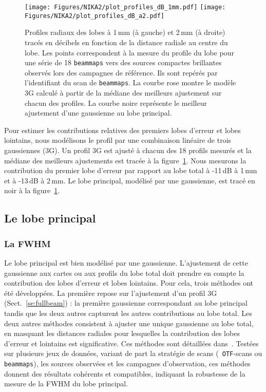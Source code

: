 \begin{figure}[!thbp]
  \centering
   \texttt{[image: Figures/NIKA2/plot\_profiles\_dB\_1mm.pdf]}
   \texttt{[image: Figures/NIKA2/plot\_profiles\_dB\_a2.pdf]}
   \caption[Stability of the beam profile]{Profiles radiaux des lobes
     à 1\,mm (à gauche) et 2\,mm (à droite) tracés en décibels en
     fonction de la distance radiale au centre du lobe. Les points
     correspondent à la mesure du profile du lobe pour une série de 18
     {\tt beammaps} vers des sources compactes brillantes observés
     lors des campagnes de référence. Ils sont repérés par
     l'identifiant du scan de {\tt beammaps}. La courbe rose montre le
     modèle 3G calculé à partir de la médiane des meilleurs ajustement
     sur chacun des profiles. La courbe noire représente le meilleur
     ajustement d'une gaussienne au lobe principal.}
  \label{fig:beam_prof}
\end{figure}

Pour estimer les contributions relatives des premiers lobes
d'erreur et lobes lointains, nous modélisons le profil par une
combinaison linéaire de trois gaussiennes (3G). Un profil 3G est
ajusté à chacun des 18 profils mesurés et la médiane des meilleurs
ajustements est tracée à la figure~\ref{fig:beam_prof}. Nous mesurons
la contribution du premier lobe d'erreur par rapport au lobe total à
-11\,dB à 1\,mm et à -13\,dB à 2\,mm. Le lobe principal, modélisé par
une gaussienne, est tracé en noir à la figure~\ref{fig:beam_prof}. 


\subsection{Le lobe principal}
\label{se:mainbeam}

\subsubsection{La FWHM}

Le lobe principal est bien modélisé par une gaussienne. L'ajustement
de cette gaussienne aux cartes ou aux profils du lobe total doit
prendre en compte la contribution des lobes d'erreur et lobes
lointains. Pour cela, trois méthodes ont été développées. La première
repose sur l'ajustement d'un profil 3G (Sect.~\ref{se:fullbeam}) : la
première gaussienne correspondant au lobe principal tandis que les
deux autres capturent les autres contributions au lobe total. Les deux
autres méthodes consistent à ajuster une unique gaussienne au lobe
total, en masquant les distances radiales pour lesquelles la
contribution des lobes d'erreur et lointains est significative. Ces
méthodes sont détaillées dans~\citet{Perotto2019}. Testées sur
plusieurs jeux de données, variant de part la stratégie de scans ({\tt
OTF}-scans ou {\tt beammaps}), les sources observées et les campagnes
d'observation, ces méthodes donnent des résultats cohérents et
compatibles, indiquant la robustesse de la mesure de la FWHM du lobe
principal.


